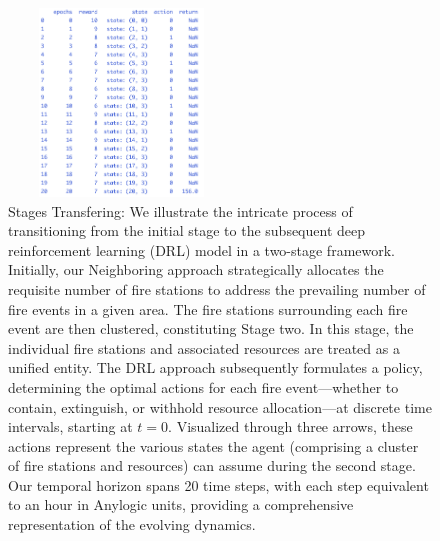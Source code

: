 \documentclass[lettersize,journal]{IEEEtran}
\begin{document}
      
        \begin{figure}[H]
          \centering
          \includegraphics[height=5cm,width=6cm]{figs/4_2000.png}
          \caption{Stages Transfering: We illustrate the intricate process of transitioning from the initial stage to the subsequent deep reinforcement learning (DRL) model in a two-stage framework. Initially, our Neighboring approach strategically allocates the requisite number of fire stations to address the prevailing number of fire events in a given area. The fire stations surrounding each fire event are then clustered, constituting Stage two. In this stage, the individual fire stations and associated resources are treated as a unified entity. The DRL approach subsequently formulates a policy, determining the optimal actions for each fire event—whether to contain, extinguish, or withhold resource allocation—at discrete time intervals, starting at $t=0$. Visualized through three arrows, these actions represent the various states the agent (comprising a cluster of fire stations and resources) can assume during the second stage. Our temporal horizon spans 20 time steps, with each step equivalent to an hour in Anylogic units, providing a comprehensive representation of the evolving dynamics.}\end{figure}
        
        
      











\end{document}
